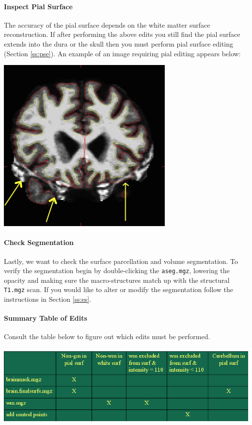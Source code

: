\documentclass[paper=a4, fontsize=11pt]{scrartcl} %
\numberwithin{equation}{section} %
\numberwithin{figure}{section} %
\numberwithin{table}{section} %
\begin{document}
\paragraph{Inspect Pial Surface}  The accuracy of the pial surface depends on the white matter surface reconstruction. If after performing the above edits you still find the pial surface extends into the dura or the skull then you must perform pial surface editing (Section \ref{ss:pse}).  An example of an image requiring pial editing appears below:

\includegraphics[scale=0.6]{pial.png}

\paragraph{Check Segmentation}  Lastly, we want to check the surface parcellation and volume segmentation.  To verify the segmentation begin by double-clicking the \texttt{aseg.mgz}, lowering the opacity and making sure the macro-structures match up with the structural \texttt{T1.mgz} scan.  If you would like to alter or modify the segmentation follow the instructions in Section \ref{ss:es}.

\paragraph{Summary Table of Edits}  Consult the table below to figure out which edits must be performed.
\paragraph{}\includegraphics[scale=0.6]{whattoedit}
\end{document}
